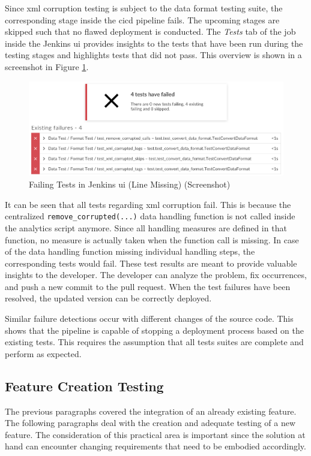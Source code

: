 Since \ac{xml} corruption testing is subject to the data format testing suite, the corresponding stage inside the \ac{cicd} pipeline fails. The upcoming stages are skipped such that no flawed deployment is conducted. The \textit{Tests} tab of the job inside the Jenkins \ac{ui} provides insights to the tests that have been run during the testing stages and highlights tests that did not pass. This overview is shown in a screenshot in Figure \ref{fig:6-jenkins-tests}.
\newpage
\begin{figure}[h!]
	\centering
	\includegraphics[width=\linewidth]{main-matter/img/6-jenkins-tests}
	\caption{Failing Tests in Jenkins \acs{ui} (Line Missing) (Screenshot)}
	\label{fig:6-jenkins-tests}
\end{figure}

It can be seen that all tests regarding \ac{xml} corruption fail. This is because the centralized \texttt{remove\_corrupted(...)} data handling function is not called inside the analytics script anymore. Since all handling measures are defined in that function, no measure is actually taken when the function call is missing. In case of the data handling function missing individual handling steps, the corresponding tests would fail. These test results are meant to provide valuable insights to the developer. The developer can analyze the problem, fix occurrences, and push a new commit to the pull request. When the test failures have been resolved, the updated version can be correctly deployed.

Similar failure detections occur with different changes of the source code. This shows that the pipeline is capable of stopping a deployment process based on the existing tests. This requires the assumption that all tests suites are complete and perform as expected.

\subsection{Feature Creation Testing}
The previous paragraphs covered the integration of an already existing feature. The following paragraphs deal with the creation and adequate testing of a new feature. The consideration of this practical area is important since the solution at hand can encounter changing requirements that need to be embodied accordingly.

